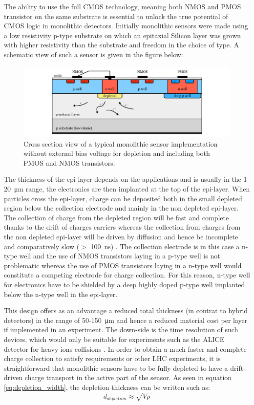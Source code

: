 		The ability to use the full CMOS technology, meaning both NMOS and PMOS transistor on the same substrate is essential to unlock the true potential of CMOS logic in monolithic detectors. Initially monolithic sensors were made using a low resistivity p-type substrate on which an epitaxial Silicon layer was grown with higher resistivity than the substrate and freedom in the choice of type. A schematic view of such a sensor is given in the figure below: 
		\begin{figure}[h]
			\centering
			\includegraphics[width=0.9\linewidth]{files/MAPS_noHV}
			\caption{Cross section view of a typical monolithic sensor implementation without external bias voltage for depletion and including both PMOS and NMOS transistors.}
			\label{im:initial_mono_XS}
		\end{figure}
		
		 The thickness of the epi-layer depends on the applications and is usually in the 1-\SI{20}{\micro\meter} range, the electronics are then implanted at the top of the epi-layer. When particles cross the epi-layer, charge can be deposited both in the small depleted region below the collection electrode and mainly in the non depleted epi-layer. The collection of charge from the depleted region will be fast and complete thanks to the drift of charges carriers whereas the collection from charges from the non depleted epi-layer will be driven by diffusion and hence be incomplete and comparatively slow ($>$ \SI{100}{\nano\second}) \cite{detectors}. The collection electrode is in this case a n-type well and the use of NMOS transistors laying in a p-type well is not problematic whereas the use of PMOS transistors laying in a n-type well would constitute a competing electrode for charge collection. For this reason, n-type well for electronics have to be shielded by a deep highly doped p-type well implanted below the n-type well in the epi-layer. 
		 
		 This design offers as an advantage a reduced total thickness (in contrat to hybrid detectors) in the range of 50-\SI{150}{\micro\meter} \cite{detectors} and hence a reduced material cost per layer  if implemented in an experiment. The down-side is the time resolution of such devices, which would only be suitable for experiments such as the ALICE detector for heavy ions collisions \cite{alpide}. In order to obtain a much faster and complete charge collection to satisfy requirements or other LHC experiments, it is straightforward that monolithic sensors have to be fully depleted to have a drift-driven charge transport in the active part of the sensor. As seen in equation \eqref{eq:depletion_width}, the depletion thickness can be written such as: 
		 \begin{equation}
		 	d_{depletion} \approx \sqrt{V \rho}
		 \end{equation}
		
